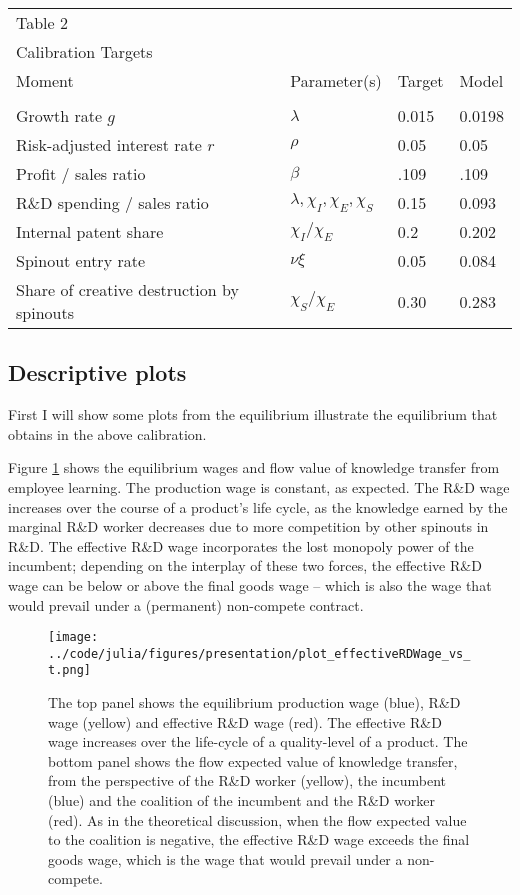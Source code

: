 \documentclass[12pt,english]{article}
\theoremstyle{remark}
\begin{document}
\begin{table}[h]
	\centering{}%
	\begin{tabular}{llll}
		Table 2 & & &  \tabularnewline
		Calibration Targets & & &  \tabularnewline
		\hline 
		Moment & Parameter(s) & Target & Model \tabularnewline
		&  &  & \tabularnewline
		\hline 
		Growth rate $g$ & $\lambda$ & 0.015 & 0.0198 \tabularnewline
		Risk-adjusted interest rate $r$ & $\rho$ & 0.05 & 0.05 \tabularnewline
		Profit / sales ratio & $\beta$ & .109 & .109 \tabularnewline
		R\&D spending / sales ratio & $\lambda,\chi_I,\chi_E,\chi_S$ & 0.15 & 0.093
		\tabularnewline
		Internal patent share & $\chi_I / \chi_E$ & 0.2 & 0.202
		\tabularnewline
		Spinout entry rate & $\nu \xi$ & 0.05 & 0.084
		\tabularnewline
		Share of creative destruction by spinouts & $ \chi_S / \chi_E$ & 0.30 & 0.283 
	\end{tabular}
\end{table}

\subsection{Descriptive plots}

First I will show some plots from the equilibrium illustrate the equilibrium that obtains in the above calibration. 

Figure \ref{RD_wages} shows the equilibrium wages and flow value of knowledge transfer from employee learning. The production wage is constant, as expected. The R\&D wage increases over the course of a product's life cycle, as the knowledge earned by the marginal R\&D worker decreases due to more competition by other spinouts in R\&D. The effective R\&D wage incorporates the lost monopoly power of the incumbent; depending on the interplay of these two forces, the effective R\&D wage can be below or above the final goods wage -- which is also the wage that would prevail under a (permanent) non-compete contract.

\begin{figure}[h]  
	\centering
	\texttt{[image: ../code/julia/figures/presentation/plot\_effectiveRDWage\_vs\_t.png]}
	\caption{The top panel shows the equilibrium production wage (blue), R\&D wage (yellow) and effective R\&D wage (red). The effective R\&D wage increases over the life-cycle of a quality-level of a product. The bottom panel shows the flow expected value of knowledge transfer, from the perspective of the R\&D worker (yellow), the incumbent (blue) and the coalition of the incumbent and the R\&D worker (red). As in the theoretical discussion, when the flow expected value to the coalition is negative, the effective R\&D wage exceeds the final goods wage, which is the wage that would prevail under a non-compete.}
	\label{RD_wages}
\end{figure}
\end{document}
